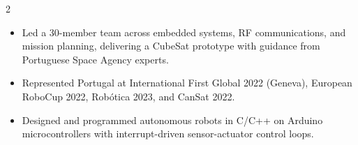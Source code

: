 \documentclass[10pt,a4paper,ragged2e,withhyper]{altacv}
\begin{document}
\begin{paracol}{2}
            \begin{itemize}
                \item Led a 30-member team across embedded systems, RF communications, and mission planning, delivering a CubeSat prototype with guidance from Portuguese Space Agency experts.
            \end{itemize}

            \begin{itemize}
                \item Represented Portugal at International First Global 2022 (Geneva), European RoboCup 2022, Robótica 2023, and CanSat 2022.
                \item Designed and programmed autonomous robots in C/C++ on Arduino microcontrollers with interrupt-driven sensor-actuator control loops.
            \end{itemize}

    \end{paracol}
\end{document}
